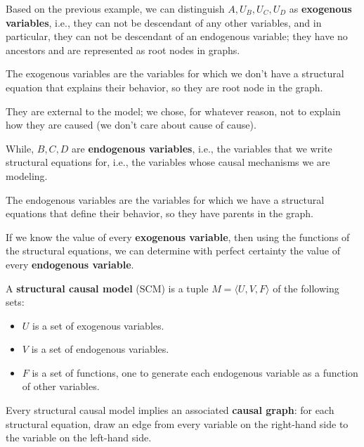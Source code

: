Based on the previous example, we can distinguish $A, U_B, U_C, U_D$ as \textbf{
    exogenous variables}, i.e., they can not be descendant of any other variables,
and in particular, they can not be descendant of an endogenous variable; they have
no ancestors and are represented as root nodes in graphs.

\begin{definition}
    The exogenous variables are the variables for which we don't have a structural
    equation that explains their behavior, so they are root node in the graph.
\end{definition}

They are external to the model; we chose, for whatever reason, not to explain how
they are caused (we don't care about cause of cause).

While, $B, C, D$ are \textbf{endogenous variables}, i.e., the variables that we
write structural equations for, i.e., the variables whose causal mechanisms we
are modeling.

\begin{definition}
    The endogenous variables are the variables for which we have a structural
    equations that define their behavior, so they have parents in the graph.
\end{definition}

If we know the value of every \textbf{exogenous variable}, then using the functions
of the structural equations, we can determine with perfect certainty the value
of every \textbf{endogenous variable}.

\begin{definition}
    A \textbf{structural causal model} (SCM) is a tuple $M = \langle U, V, F \rangle$
    of the following sets:
    \begin{itemize}
        \item $U$ is a set of exogenous variables.
        \item $V$ is a set of endogenous variables.
        \item $F$ is a set of functions, one to generate each endogenous variable
              as a function of other variables.
    \end{itemize}
\end{definition}

Every structural causal model implies an associated \textbf{causal graph}: for each
structural equation, draw an edge from every variable on the right-hand side to the
variable on the left-hand side.

